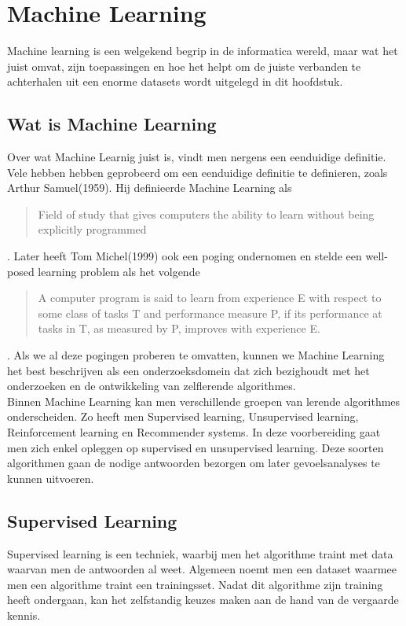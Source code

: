\section{Machine Learning}\label{Machine Learning}

Machine learning is een welgekend begrip in de informatica wereld, maar wat het juist omvat, zijn toepassingen en hoe het helpt om de juiste verbanden te achterhalen uit een enorme datasets wordt uitgelegd in dit hoofdstuk.

\subsection{Wat is Machine Learning}\label{Wat is Machine Learning}

Over wat Machine Learnig juist is, vindt men nergens een eenduidige definitie. Vele hebben hebben geprobeerd om een eenduidige definitie te definieren, zoals Arthur Samuel(1959). Hij definieerde Machine Learning als \begin{quote}Field of study that gives computers the ability to learn without being explicitly programmed\end{quote}. Later heeft Tom Michel(1999) ook een poging ondernomen en stelde een well-posed learning problem als het volgende \begin{quote} A computer program is said to learn from experience E with respect to some class of tasks T and performance measure P, if its performance at tasks in T, as measured by P, improves with experience E. \end{quote}. Als we al deze pogingen proberen te omvatten, kunnen we Machine Learning het best beschrijven als een onderzoeksdomein dat zich bezighoudt met het onderzoeken en de ontwikkeling van zelflerende algorithmes.
\\
Binnen Machine Learning kan men verschillende groepen van lerende algorithmes onderscheiden. Zo heeft men Supervised learning, Unsupervised learning, Reinforcement learning en Recommender systems. In deze voorbereiding gaat men zich enkel opleggen op supervised en unsupervised learning. Deze soorten algorithmen gaan de nodige antwoorden bezorgen om later gevoelsanalyses te kunnen uitvoeren.


\subsection{Supervised Learning}\label{Supervised Learning}

Supervised learning is een techniek, waarbij men het algorithme traint met data waarvan men de antwoorden al weet. Algemeen noemt men een dataset waarmee men een algorithme traint een trainingsset. Nadat dit algorithme zijn training heeft ondergaan, kan het zelfstandig keuzes maken aan de hand van de vergaarde kennis.

